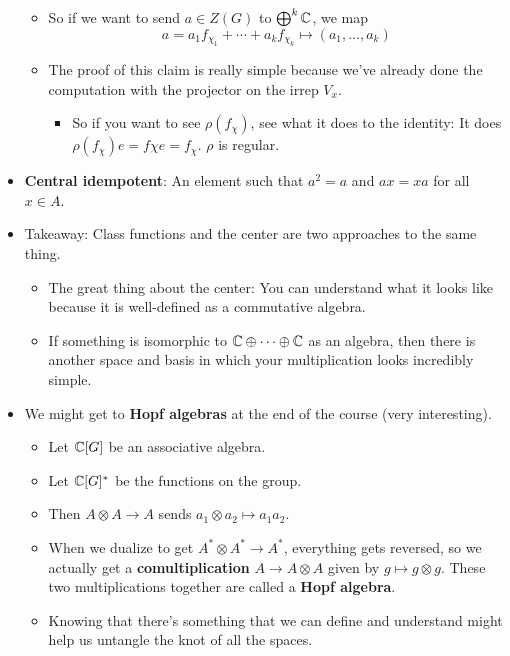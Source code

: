 \documentclass[../notes.tex]{subfiles}
\begin{document}
\begin{itemize}
\begin{itemize}
\begin{equation*}
        \end{equation*}
        \item So if we want to send $a\in Z(G)$ to $\bigoplus^k\mathbb{C}$, we map
        \begin{equation*}
            a=a_1f_{\chi_1}+\cdots+a_kf_{\chi_k} \mapsto (a_1,\dots,a_k)
        \end{equation*}
        \item The proof of this claim is really simple because we've already done the computation with the projector on the irrep $V_x$.
        \begin{itemize}
            \item So if you want to see $\rho(f_\chi)$, see what it does to the identity: It does $\rho(f_\chi)e=f\chi e=f_\chi$. $\rho$ is regular.
        \end{itemize}
    \end{itemize}
    \item \textbf{Central idempotent}: An element such that $a^2=a$ and $ax=xa$ for all $x\in A$.
    \item Takeaway: Class functions and the center are two approaches to the same thing.
    \begin{itemize}
        \item The great thing about the center: You can understand what it looks like because it is well-defined as a commutative algebra.
        \item If something is isomorphic to $\mathbb{C}\oplus\cdots\oplus\mathbb{C}$ as an algebra, then there is another space and basis in which your multiplication looks incredibly simple.
    \end{itemize}
    \item We might get to \textbf{Hopf algebras} at the end of the course (very interesting).
    \begin{itemize}
        \item Let $\mathbb{C}[G]$ be an associative algebra.
        \item Let $\mathbb{C}[G]^*$ be the functions on the group.
        \item Then $A\otimes A\to A$ sends $a_1\otimes a_2\mapsto a_1a_2$.
        \item When we dualize to get $A^*\otimes A^*\to A^*$, everything gets reversed, so we actually get a \textbf{comultiplication} $A\to A\otimes A$ given by $g\mapsto g\otimes g$. These two multiplications together are called a \textbf{Hopf algebra}.
        \item Knowing that there's something that we can define and understand might help us untangle the knot of all the spaces.

\end{itemize}
\end{itemize}
\end{document}
